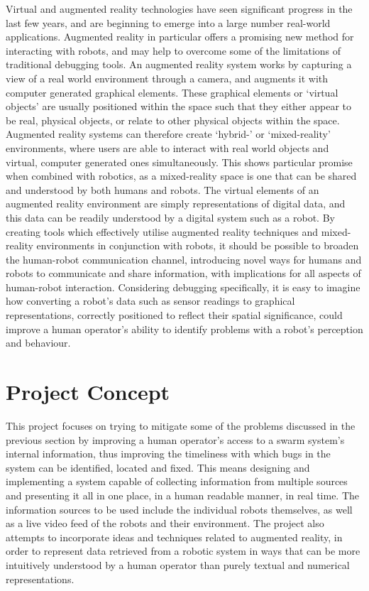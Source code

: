 Virtual and augmented reality technologies have seen significant progress in the last few years, and are beginning to emerge into a large number real-world applications. Augmented reality in particular offers a promising new method for interacting with robots, and may help to overcome some of the limitations of traditional debugging tools. An augmented reality system works by capturing a view of a real world environment through a camera, and augments it with computer generated graphical elements. These graphical elements or `virtual objects' are usually positioned within the space such that they either appear to be real, physical objects, or relate to other physical objects within the space. Augmented reality systems can therefore create `hybrid-' or `mixed-reality' environments, where users are able to interact with real world objects and virtual, computer generated ones simultaneously. This shows particular promise when combined with robotics, as a mixed-reality space is one that can be shared and understood by both humans and robots. The virtual elements of an augmented reality environment are simply representations of digital data, and this data can be readily understood by a digital system such as a robot. By creating tools which effectively utilise augmented reality techniques and mixed-reality environments in conjunction with robots, it should be possible to broaden the human-robot communication channel, introducing novel ways for humans and robots to communicate and share information, with implications for all aspects of human-robot interaction. Considering debugging specifically, it is easy to imagine how converting a robot's data such as sensor readings to graphical representations, correctly positioned to reflect their spatial significance, could improve a human operator's ability to identify problems with a robot's perception and behaviour.


\section{Project Concept} \label{ProjectConcept}
This project focuses on trying to mitigate some of the problems discussed in the previous section by improving a human operator's access to a swarm system's internal information, thus improving the timeliness with which bugs in the system can be identified, located and fixed. This means designing and implementing a system capable of collecting information from multiple sources and presenting it all in one place, in a human readable manner, in real time. The information sources to be used include the individual robots themselves, as well as a live video feed of the robots and their environment. The project also attempts to incorporate ideas and techniques related to augmented reality, in order to represent data retrieved from a robotic system in ways that can be more intuitively understood by a human operator than purely textual and numerical representations.


